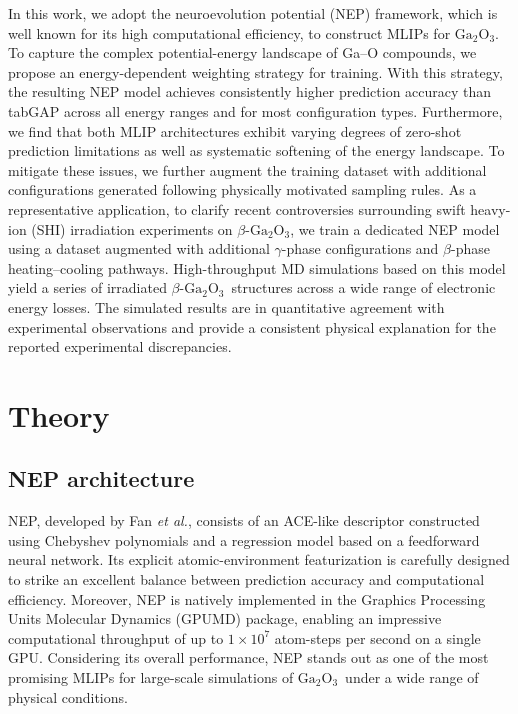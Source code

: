 \documentclass[aip,graphicx,amsmath,amssymb]{revtex4-1}
\newcommand{\ga}{$\text{Ga}_2\text{O}_3$}
\begin{document}
In this work, we adopt the neuroevolution potential (NEP) framework, which is well known
for its high computational efficiency,\cite{xu_gpumd_2025} to construct MLIPs for \ga.
To capture the complex potential-energy landscape of Ga--O compounds, we propose an
energy-dependent weighting strategy for training.
With this strategy, the resulting NEP model achieves consistently higher prediction
accuracy than tabGAP across all energy ranges and for most configuration types.
Furthermore, we find that both MLIP architectures exhibit varying degrees of zero-shot
prediction limitations as well as systematic softening of the energy landscape.
To mitigate these issues, we further augment the training dataset with additional
configurations generated following physically motivated sampling rules.
As a representative application, to clarify recent controversies surrounding swift heavy-ion (SHI) 
irradiation experiments on $\beta$-\ga, we train a dedicated NEP model using a
dataset augmented with additional $\gamma$-phase configurations and $\beta$-phase
heating--cooling pathways.
High-throughput MD simulations based on this model yield a series of irradiated
$\beta$-\ga\ structures across a wide range of electronic energy losses.
The simulated results are in quantitative agreement with experimental observations and
provide a consistent physical explanation for the reported experimental discrepancies.

\section{Theory}

\subsection{NEP architecture}

NEP, developed by Fan \textit{et al.}, consists of an ACE-like descriptor constructed using 
Chebyshev polynomials and a regression model based on 
a feedforward neural network.\cite{fan_neuroevolution_2021,fan_gpumd_2022,song_general-purpose_2024} 
Its explicit atomic-environment featurization is carefully designed to strike an excellent 
balance between prediction accuracy and computational efficiency. 
Moreover, NEP is natively implemented in the Graphics Processing Units Molecular Dynamics 
(GPUMD) package, enabling an impressive computational throughput of up to $1\times10^{7}$ 
atom-steps per second on a single GPU.\cite{xu_gpumd_2025} 
Considering its overall performance, NEP stands out as one of the most promising 
MLIPs for large-scale simulations of \ga\ under a wide range of physical conditions.
\end{document}
